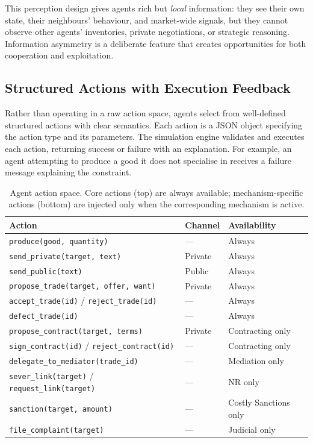 \documentclass{article}
\begin{document}
This perception design gives agents rich but \textit{local} information: they see their own state, their neighbours' behaviour, and market-wide signals, but they cannot observe other agents' inventories, private negotiations, or strategic reasoning. Information asymmetry is a deliberate feature that creates opportunities for both cooperation and exploitation.

\subsection{Structured Actions with Execution Feedback}

Rather than operating in a raw action space, agents select from well-defined structured actions with clear semantics. Each action is a JSON object specifying the action type and its parameters. The simulation engine validates and executes each action, returning success or failure with an explanation. For example, an agent attempting to produce a good it does not specialise in receives a failure message explaining the constraint.

\begin{table}[H]
\centering
\begin{tabular}{@{}lll@{}}
\toprule
Action & Channel & Availability \\
\midrule
\texttt{produce(good, quantity)} & --- & Always \\
\texttt{send\_private(target, text)} & Private & Always \\
\texttt{send\_public(text)} & Public & Always \\
\texttt{propose\_trade(target, offer, want)} & Private & Always \\
\texttt{accept\_trade(id)} / \texttt{reject\_trade(id)} & --- & Always \\
\texttt{defect\_trade(id)} & --- & Always \\
\texttt{propose\_contract(target, terms)} & Private & Contracting only \\
\texttt{sign\_contract(id)} / \texttt{reject\_contract(id)} & --- & Contracting only \\
\texttt{delegate\_to\_mediator(trade\_id)} & --- & Mediation only \\
\texttt{sever\_link(target)} / \texttt{request\_link(target)} & --- & NR only \\
\texttt{sanction(target, amount)} & --- & Costly Sanctions only \\
\texttt{file\_complaint(target)} & --- & Judicial only \\
\bottomrule
\end{tabular}
\caption{Agent action space. Core actions (top) are always available; mechanism-specific actions (bottom) are injected only when the corresponding mechanism is active.}
\label{tab:actions}
\end{table}
\end{document}
